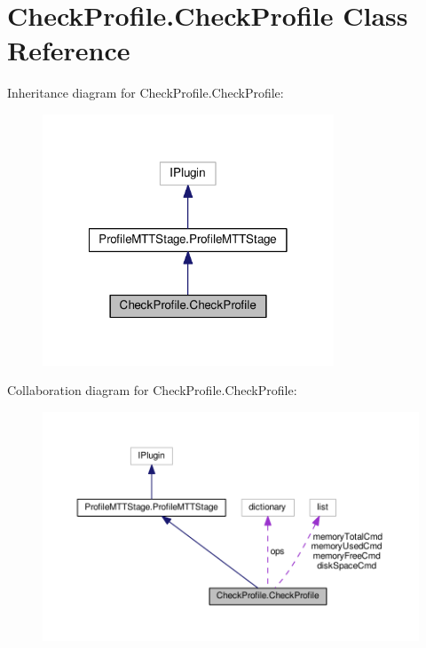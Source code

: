 \hypertarget{class_check_profile_1_1_check_profile}{\section{Check\-Profile.\-Check\-Profile Class Reference}
\label{class_check_profile_1_1_check_profile}
}


Inheritance diagram for Check\-Profile.\-Check\-Profile\-:
\nopagebreak
\begin{figure}[H]
\begin{center}
\leavevmode
\includegraphics[width=246pt]{class_check_profile_1_1_check_profile__inherit__graph}
\end{center}
\end{figure}


Collaboration diagram for Check\-Profile.\-Check\-Profile\-:
\nopagebreak
\begin{figure}[H]
\begin{center}
\leavevmode
\includegraphics[width=350pt]{class_check_profile_1_1_check_profile__coll__graph}
\end{center}
\end{figure}
